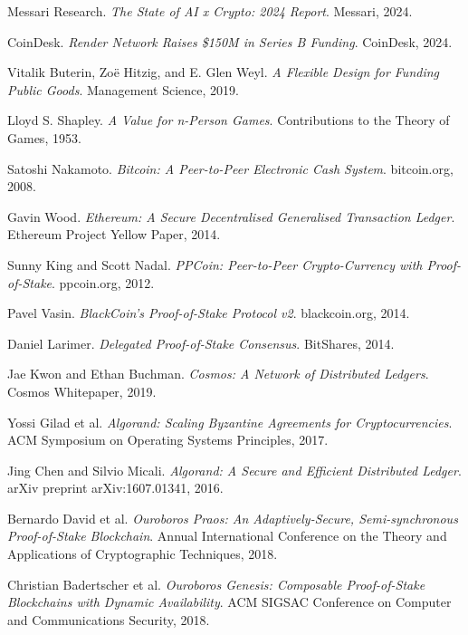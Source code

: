 \documentclass[11pt,letterpaper]{article}
\theoremstyle{definition}
\theoremstyle{remark}
\begin{document}
\begin{thebibliography}{99}

Messari Research.
\textit{The State of AI x Crypto: 2024 Report}.
Messari, 2024.

CoinDesk.
\textit{Render Network Raises \$150M in Series B Funding}.
CoinDesk, 2024.

Vitalik Buterin, Zoë Hitzig, and E. Glen Weyl.
\textit{A Flexible Design for Funding Public Goods}.
Management Science, 2019.

Lloyd S. Shapley.
\textit{A Value for n-Person Games}.
Contributions to the Theory of Games, 1953.

Satoshi Nakamoto.
\textit{Bitcoin: A Peer-to-Peer Electronic Cash System}.
bitcoin.org, 2008.

Gavin Wood.
\textit{Ethereum: A Secure Decentralised Generalised Transaction Ledger}.
Ethereum Project Yellow Paper, 2014.

Sunny King and Scott Nadal.
\textit{PPCoin: Peer-to-Peer Crypto-Currency with Proof-of-Stake}.
ppcoin.org, 2012.

Pavel Vasin.
\textit{BlackCoin's Proof-of-Stake Protocol v2}.
blackcoin.org, 2014.

Daniel Larimer.
\textit{Delegated Proof-of-Stake Consensus}.
BitShares, 2014.

Jae Kwon and Ethan Buchman.
\textit{Cosmos: A Network of Distributed Ledgers}.
Cosmos Whitepaper, 2019.

Yossi Gilad et al.
\textit{Algorand: Scaling Byzantine Agreements for Cryptocurrencies}.
ACM Symposium on Operating Systems Principles, 2017.

Jing Chen and Silvio Micali.
\textit{Algorand: A Secure and Efficient Distributed Ledger}.
arXiv preprint arXiv:1607.01341, 2016.

Bernardo David et al.
\textit{Ouroboros Praos: An Adaptively-Secure, Semi-synchronous Proof-of-Stake Blockchain}.
Annual International Conference on the Theory and Applications of Cryptographic Techniques, 2018.

Christian Badertscher et al.
\textit{Ouroboros Genesis: Composable Proof-of-Stake Blockchains with Dynamic Availability}.
ACM SIGSAC Conference on Computer and Communications Security, 2018.


\end{thebibliography}
\end{document}
